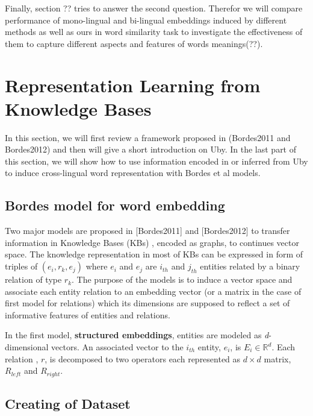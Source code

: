\documentclass[11pt]{article}
\begin{document}
 Finally, section ?? tries to answer the second question. Therefor we will compare performance of 
 mono-lingual and bi-lingual embeddings induced by different methods as well as ours in 
 word similarity task to investigate the effectiveness of them to
 capture different aspects and features of words meanings(??).
 
 

\section{Representation Learning from Knowledge Bases}

In this section, we will first review a framework proposed in (Bordes2011 and Bordes2012) and then will give  
a short introduction on Uby. In the last part of this section,
 we will show how to use information encoded in or inferred from Uby to induce cross-lingual word representation 
with Bordes et al models.


\subsection{Bordes model for word embedding}
\label{ssect:bordes}
Two major models are proposed in [Bordes2011] and [Bordes2012] to transfer information in Knowledge Bases (KBs)
, encoded as graphs, to continues vector space. The knowledge representation in most of KBs can be expressed
 in form of triples of $(e_{i},r_{k} , e_{j} )$ where $e_{i}$ and $e_{j}$ are $i_{th}$ and $j_{th}$ entities related
 by a binary relation of type $r_{k}$. The purpose of the models is to induce a vector space and associate
  each entity relation to an embedding vector (or a matrix in the case of first model for relations)
   which its dimensions are supposed to reflect a set of informative features of entities and relations.
   
   In the first model, \textbf{structured embeddings}, entities are modeled as \textit{d}-dimensional vectors.
    An associated vector to the $i_{th}$ entity, $e_{i}$, is $E_{i} \in \mathbb{R}^{d}$. Each relation , $r$, 
    is decomposed to two operators each represented as $d \times d$ matrix, $R_{left}$ and $R_{right}$. 
   
   
  
  
   
   





\subsection{Creating of Dataset}
\label{ssec:uby-rel}
\end{document}
